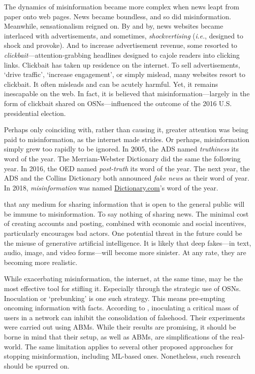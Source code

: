 The dynamics of misinformation became more complex when news leapt from paper onto web pages. News became boundless, and so did misinformation. Meanwhile, sensationalism reigned on. By and by, news websites became interlaced with advertisements, and sometimes, \emph{shockvertising} (\emph{i.e.}, designed to shock and provoke). And to increase advertisement revenue, some resorted to \emph{clickbait}—attention-grabbing headlines designed to cajole readers into clicking links. Clickbait has taken up residence on the internet. To sell advertisements, `drive traffic', `increase engagement', or simply mislead, many websites resort to clickbait. It often misleads and can be acutely harmful. Yet, it remains inescapable on the web. In fact, it is believed that misinformation—largely in the form of clickbait shared on \acp{OSN}—influenced the outcome of the 2016 U.S. presidential election.

Perhaps only coinciding with, rather than causing it, greater attention was being paid to misinformation, as the internet made strides. Or perhaps, misinformation simply grew too rapidly to be ignored. In 2005, the \ac{ADS} named \emph{truthiness} its word of the year. The Merriam-Webster Dictionary did the same the following year.
In 2016, the \ac{OED} named \emph{post-truth} its word of the year. The next year, the \ac{ADS} and the Collins Dictionary both announced \emph{fake news} as their word of year. In 2018, \emph{misinformation} was named \href{https://www.dictionary.com}{Dictionary.com}'s word of the year.

 that any medium for sharing information that is open to the general public will be immune to misinformation. To say nothing of sharing news. The minimal cost of creating accounts and posting, combined with economic and social incentives, particularly encourages bad actors. One potential threat in the future could be the misuse of generative artificial intelligence. It is likely that deep fakes—in text, audio, image, and video forms—will become more sinister. At any rate, they are becoming more realistic.

While exacerbating misinformation, the internet, at the same time, may be the most effective tool for stifling it. Especially through the strategic use of \acp{OSN}. Inoculation or `prebunking' is one such strategy. This means pre-empting oncoming information with facts. According to , inoculating a critical mass of users in a network can inhibit the consolidation of falsehood. Their experiments were carried out using \acp{ABM}. While their results are promising, it should be borne in mind that their setup, as well as \acp{ABM}, are simplifications of the real-world. The same limitation applies to several other proposed approaches for stopping misinformation, including \ac{ML}-based ones. Nonetheless, such research should be spurred on.

